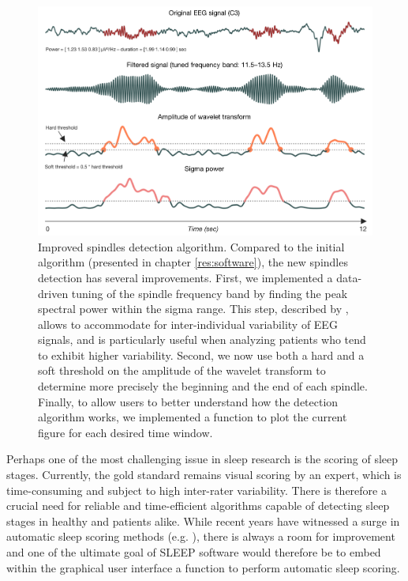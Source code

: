 \begin{figure}[htb]
	\includegraphics[width=\textwidth]{Fig/Discussion/spindles.png}
	\caption[Improved spindles detection algorithm]{Improved spindles detection algorithm. Compared to the initial algorithm (presented in chapter \ref{res:software}), the new spindles detection has several improvements. First, we implemented a data-driven tuning of the spindle frequency band by finding the peak spectral power within the sigma range. This step, described by \citet{berthomier_automatic_2007}, allows to accommodate for inter-individual variability of EEG signals, and is particularly useful when analyzing patients who tend to exhibit higher variability. Second, we now use both a hard and a soft threshold on the amplitude of the wavelet transform to determine more precisely the beginning and the end of each spindle. Finally, to allow users to better understand how the detection algorithm works, we implemented a function to plot the current figure for each desired time window.}
	\label{fig:disc:methods:future:spindles}
\end{figure}

Perhaps one of the most challenging issue in sleep research is the scoring of sleep stages. Currently, the gold standard remains visual scoring by an expert, which is time-consuming and subject to high inter-rater variability. There is therefore a crucial need for reliable and time-efficient algorithms capable of detecting sleep stages in healthy and patients alike. While recent years have witnessed a surge in automatic sleep scoring methods (e.g. \citealp{berthomier_automatic_2007, lajnef_learning_2015}), there is always a room for improvement and one of the ultimate goal of SLEEP software would therefore be to embed within the graphical user interface a function to perform automatic sleep scoring.

